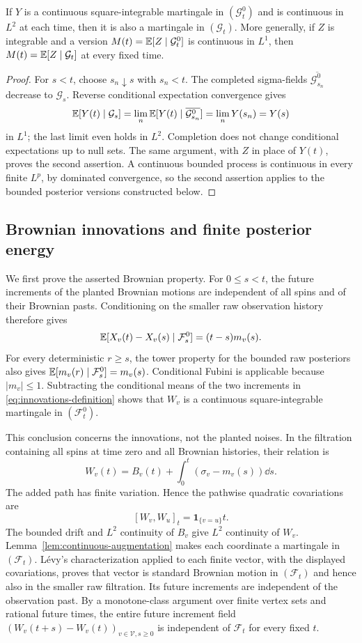 \begin{lemma}
 \label{lem:continuous-augmentation}
If $Y$ is a continuous square-integrable martingale in
$(\mathcal G_t^0)$ and is continuous in $L^2$ at each time, then it is
also a martingale in $(\mathcal G_t)$.  More generally, if $Z$ is
integrable and a version $M(t)=\mathbb E[Z\mid\mathcal G_t^0]$ is continuous
in $L^1$, then $M(t)=\mathbb E[Z\mid\mathcal G_t]$ at every fixed time.
\end{lemma}

\begin{proof}
For $s<t$, choose $s_n\downarrow s$ with $s_n<t$.  The completed
sigma-fields $\overline{\mathcal G_{s_n}^0}$ decrease to
$\mathcal G_s$.  Reverse conditional expectation convergence gives
\[
 \mathbb E[Y(t)\mid\mathcal G_s]
   =\lim_n\mathbb E[Y(t)\mid\overline{\mathcal G_{s_n}^0}]
   =\lim_n Y(s_n)=Y(s)
\]
in $L^1$; the last limit even holds in $L^2$.  Completion does not
change conditional expectations up to null sets.  The same argument,
with $Z$ in place of $Y(t)$, proves the second assertion.  A continuous
bounded process is continuous in every finite $L^p$, by dominated
convergence, so the second assertion applies to the bounded posterior
versions constructed below.
\end{proof}

\subsection{Brownian innovations and finite posterior energy}

We first prove the asserted Brownian property.  For $0\le s<t$, the
future increments of the planted Brownian motions are independent of
all spins and of their Brownian pasts.  Conditioning on the smaller
raw observation history therefore gives
\[
 \mathbb E[X_v(t)-X_v(s)\mid\mathcal F_s^0]=(t-s)m_v(s).
\]
For every deterministic $r\ge s$, the tower property for the bounded
raw posteriors also gives
$\mathbb E[m_v(r)\mid\mathcal F_s^0]=m_v(s)$.  Conditional Fubini is
applicable because $|m_v|\le1$.  Subtracting the conditional means of
the two increments in \eqref{eq:innovations-definition} shows that
$W_v$ is a continuous square-integrable martingale in
$(\mathcal F_t^0)$.

This conclusion concerns the innovations, not the planted noises.
In the filtration containing all spins at time zero and all Brownian
histories, their relation is
\[
 W_v(t)=B_v(t)+\int_0^t(\sigma_v-m_v(s))\dd s.
\]
The added path has finite variation.  Hence the pathwise quadratic
covariations are
\[
 [W_v,W_u]_t=\mathbf 1_{\{v=u\}}t.
\]
The bounded drift and $L^2$ continuity of $B_v$ give $L^2$ continuity
of $W_v$.  Lemma~\ref{lem:continuous-augmentation} makes each
coordinate a martingale in $(\mathcal F_t)$.  L\'evy's characterization
applied to each finite vector, with the displayed covariations, proves
that vector is standard Brownian motion in $(\mathcal F_t)$ and hence
also in the smaller raw filtration.  Its future increments are
independent of the observation past.  By a monotone-class argument
over finite vertex sets and rational future times, the entire future
increment field
$(W_v(t+s)-W_v(t))_{v\in\mathcal V,s\ge0}$ is independent of
$\mathcal F_t$ for every fixed $t$.

